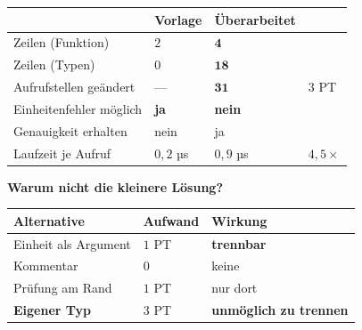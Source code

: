\begin{merksatz}
\begin{center}
{\small
\renewcommand{\arraystretch}{1.45}
\begin{tabular}{@{}P{2.8cm}P{2.2cm}P{2.4cm}P{1.8cm}@{}}
\toprule
& \textbf{Vorlage} & \textbf{Überarbeitet} & \\
\midrule
Zeilen (Funktion) & $2$ & $\mathbf{4}$ & \\
Zeilen (Typen) & $0$ & $\mathbf{18}$ & \\
Aufrufstellen geändert & --- & $\mathbf{31}$ & \textcolor{akzent}{$3$ PT}\\
Einheitenfehler möglich & \textcolor{akzent}{\textbf{ja}} & \textcolor{gruen}{\textbf{nein}} & \\
Genauigkeit erhalten & \textcolor{akzent}{nein} & \textcolor{gruen}{ja} & \\
Laufzeit je Aufruf & $0{,}2$ µs & $0{,}9$ µs & \textcolor{mittel}{$4{,}5\times$}\\
\bottomrule
\end{tabular}}
\end{center}

\begin{center}
\begin{minipage}{0.88\textwidth}
\end{minipage}
\end{center}

\textbf{Warum nicht die kleinere Lösung?}

\begin{center}
\renewcommand{\arraystretch}{1.45}
\begin{tabular}{@{}P{3.0cm}P{2.2cm}P{2.6cm}@{}}
\toprule
\textbf{Alternative} & \textbf{Aufwand} & \textbf{Wirkung}\\
\midrule
Einheit als Argument & \textcolor{gruen}{$1$ PT} & \textcolor{akzent}{\textbf{trennbar}}\\
Kommentar & \textcolor{gruen}{$0$} & \textcolor{akzent}{keine}\\
Prüfung am Rand & $1$ PT & \textcolor{mittel}{nur dort}\\
\textbf{Eigener Typ} & $3$ PT & \textcolor{gruen}{\textbf{unmöglich zu trennen}}\\
\bottomrule
\end{tabular}
\end{center}

\begin{center}
\end{center}
\end{merksatz}

